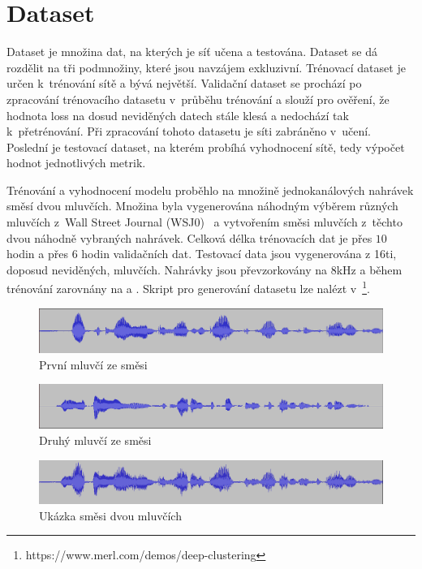 \section{Dataset}
Dataset je množina dat, na kterých je síť učena a testována. Dataset se dá rozdělit na tři podmnožiny, které jsou navzájem exkluzivní. Trénovací dataset je určen k~trénování sítě a bývá největší. Validační dataset se prochází po zpracování trénovacího datasetu v~průběhu trénování a slouží pro ověření, že hodnota loss na dosud neviděných datech stále klesá a nedochází tak k~přetrénování. Při zpracování tohoto datasetu je síti zabráněno v~učení. Poslední je testovací dataset, na kterém probíhá vyhodnocení sítě, tedy výpočet hodnot jednotlivých metrik. 

Trénování a vyhodnocení modelu proběhlo na množině jednokanálových nahrávek směsí dvou mluvčích. Množina byla vygenerována náhodným výběrem různých mluvčích z~Wall Street Journal (WSJ0)~\cite{DBLP-dataset} a vytvořením směsi mluvčích z~těchto dvou náhodně vybraných nahrávek. Celková délka trénovacích dat je přes $10$ hodin a přes $6$ hodin validačních dat. Testovací data jsou vygenerována z 16ti, doposud neviděných, mluvčích. Nahrávky jsou převzorkovány na 8kHz a během trénování zarovnány na  a . Skript pro generování datasetu lze nalézt v~\footnote{https://www.merl.com/demos/deep-clustering}.

\begin{figure}[H]
    \centering
    \includegraphics[scale=0.35]{obrazky-figures/dataset-s1.png}
    \caption{\label{fig:ref-s1}První mluvčí ze směsi}
\end{figure}

\begin{figure}[H]
    \centering
    \includegraphics[scale=0.35]{obrazky-figures/dataset-s2.png}
    \caption{\label{fig:ref-s2}Druhý mluvčí ze směsi}
\end{figure}

\begin{figure}[H]
    \centering
    \includegraphics[scale=0.35]{obrazky-figures/dataset-mix.png}
    \caption{\label{fig:ref-mixture}Ukázka směsi dvou mluvčích}
\end{figure}


